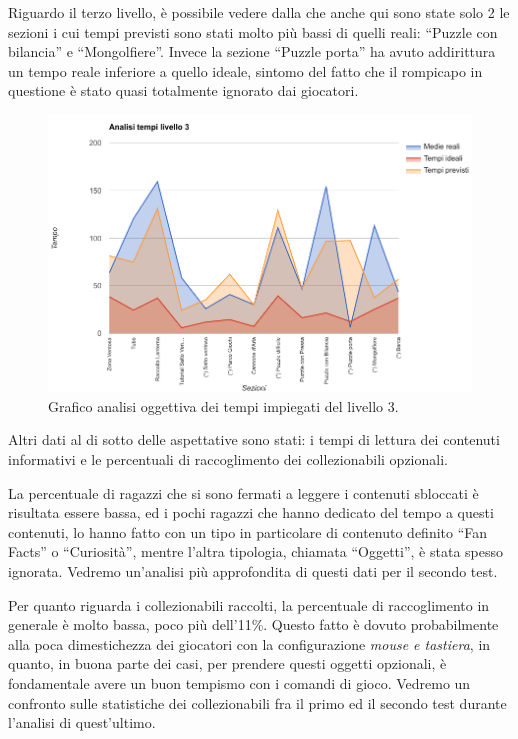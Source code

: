 Riguardo il terzo livello, è possibile vedere dalla  \myfig{\ref{fig:test_analisi_tempi_03}} che anche qui sono state solo 2 le sezioni i cui tempi previsti sono stati molto più bassi di quelli reali: ``Puzzle con bilancia'' e ``Mongolfiere''. Invece la sezione ``Puzzle porta'' ha avuto addirittura un tempo reale inferiore a quello ideale, sintomo del fatto che il rompicapo in questione è stato quasi totalmente ignorato dai giocatori.

\begin{figure}[h]
\centerline{\includegraphics[scale=0.45]{images/risultati/test_01_analisi_tempi_03.png}}
\caption{Grafico analisi oggettiva dei tempi impiegati del livello 3.}
\label{fig:test_analisi_tempi_03}
\end{figure}

Altri dati al di sotto delle aspettative sono stati: i tempi di lettura dei contenuti informativi e le percentuali di raccoglimento dei collezionabili opzionali. 

La percentuale di ragazzi che si sono fermati a leggere i contenuti sbloccati è risultata essere bassa, ed i pochi ragazzi che hanno dedicato del tempo a questi contenuti, lo hanno fatto con un tipo in particolare di contenuto definito ``Fan Facts'' o ``Curiosità'', mentre l'altra tipologia, chiamata ``Oggetti'', è stata spesso ignorata. Vedremo un'analisi più approfondita di questi dati per il secondo test.

Per quanto riguarda i collezionabili raccolti, la percentuale di raccoglimento in generale è molto bassa, poco più dell'11\%. Questo fatto è dovuto probabilmente alla poca dimestichezza dei giocatori con la configurazione \textit{mouse e tastiera}, in quanto, in buona parte dei casi, per prendere questi oggetti opzionali, è fondamentale avere un buon tempismo con i comandi di gioco. Vedremo un confronto sulle statistiche dei collezionabili fra il primo ed il secondo test durante l'analisi di quest'ultimo.

